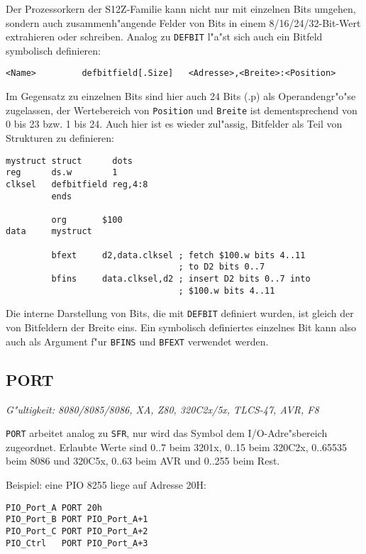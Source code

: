 \documentclass[12pt,a4paper,twoside]{report}
\makeatletter
\newcommand{\tty}[1]{{\tt #1}}
\newcommand{\ttindex}[1]{\index{#1@{\tt #1}}}
\makeatother
\begin{document}
Der Prozessorkern der S12Z-Familie kann nicht nur mit einzelnen Bits
umgehen, sondern auch zusammenh"angende Felder von Bits in einem
8/16/24/32-Bit-Wert extrahieren oder schreiben.  Analog zu
\tty{DEFBIT} l"a"st sich auch ein Bitfeld symbolisch definieren:
\begin{verbatim}
<Name>         defbitfield[.Size]   <Adresse>,<Breite>:<Position>
\end{verbatim}
Im Gegensatz zu einzelnen Bits sind hier auch 24 Bits (.p) als
Operandengr"o"se zugelassen, der Wertebereich von \tty{Position} und
\tty{Breite} ist dementsprechend von 0 bis 23 bzw. 1 bis 24.  Auch
hier ist es wieder zul"assig, Bitfelder als Teil von Strukturen zu
definieren:
\begin{verbatim}
mystruct struct      dots
reg      ds.w        1
clksel   defbitfield reg,4:8
         ends

         org       $100
data     mystruct

         bfext     d2,data.clksel ; fetch $100.w bits 4..11
                                  ; to D2 bits 0..7
         bfins     data.clksel,d2 ; insert D2 bits 0..7 into
                                  ; $100.w bits 4..11
\end{verbatim}
Die interne Darstellung von Bits, die mit \tty{DEFBIT} definiert
wurden, ist gleich der von Bitfeldern der Breite eins.  Ein
symbolisch definiertes einzelnes Bit kann also auch als Argument
f"ur \tty{BFINS} und \tty{BFEXT} verwendet werden.


\subsection{PORT}
\ttindex{PORT}

{\em G"ultigkeit: 8080/8085/8086, XA, Z80, 320C2x/5x, TLCS-47, AVR, F8}

\tty{PORT} arbeitet analog zu \tty{SFR}, nur wird das Symbol dem I/O-Adre"sbereich
zugeordnet.  Erlaubte Werte sind 0..7 beim 3201x, 0..15 beim 320C2x,
0..65535 beim 8086 und 320C5x, 0..63 beim AVR und 0..255 beim Rest.
\par
Beispiel: eine PIO 8255 liege auf Adresse 20H:
\begin{verbatim}
PIO_Port_A PORT 20h
PIO_Port_B PORT PIO_Port_A+1
PIO_Port_C PORT PIO_Port_A+2
PIO_Ctrl   PORT PIO_Port_A+3
\end{verbatim}

\end{document}
